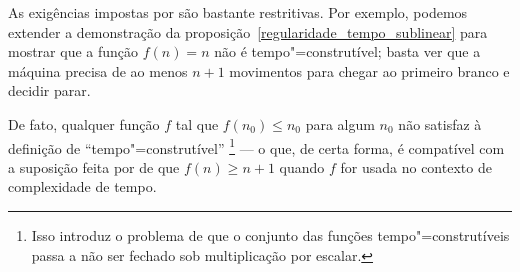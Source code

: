 As exigências impostas por 
são bastante restritivas.
Por exemplo,
podemos extender a demonstração da proposição~\ref{regularidade_tempo_sublinear}
para mostrar que a função $f(n) = n$
não é tempo"=construtível;
basta ver que a máquina precisa de ao menos $n+1$ movimentos
para chegar ao primeiro branco e decidir parar.

De fato, qualquer função $f$ tal que $f(n_0) \leq n_0$ para algum $n_0$
não satisfaz à definição de ``tempo"=construtível''
\footnote{
    Isso introduz o problema de que o conjunto das funções tempo"=construtíveis
    passa a não ser fechado sob multiplicação por escalar.
}
--- o que, de certa forma,
é compatível com a suposição feita por 
de que $f(n) \geq n+1$
quando $f$ for usada no contexto de complexidade de tempo.
